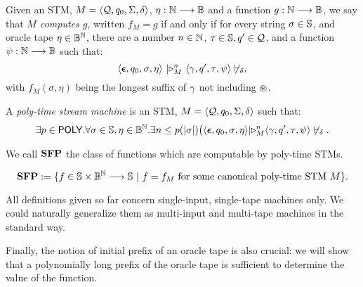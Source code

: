 \begin{defn}\label{df:STMcomputation}
Given an STM,
$M = \langle \textcolor{black}{\mathcal{Q}}, \textcolor{black}{q_0}, \textcolor{black}{\Sigma}, \textcolor{black}{\delta}\rangle$,
$\eta:\mathbb{N} \longrightarrow \mathbb{B}$ and a function
$g : \mathbb{N} \longrightarrow \mathbb{B}$,
we say that
\emph{$M$ computes $g$},
written $f_M = g$ if and only if for every
string $\sigma\in \mathbb{S}$,
and oracle tape $\textcolor{black}{\eta} \in \mathbb{B}^{\mathbb{N}}$,
there are a number $n\in \mathbb{N}$, $\textcolor{black}{\tau}\in \mathbb{S}, \textcolor{black}{q'} \in \mathcal{Q}$,
and a function
$\textcolor{black}{\psi} : \mathbb{N} \longrightarrow \mathbb{B}$ such that:
$$
\langle \textcolor{black}{\bm{\epsilon}}, \textcolor{black}{q_0}, \textcolor{black}{\sigma}, \textcolor{black}{\eta}\rangle
\ \lvert\triangleright^n_M \
\langle \textcolor{black}{\gamma}, \textcolor{black}{q'}, \textcolor{black}{\tau}, \textcolor{black}{\psi}\rangle
\not\vdash_{\delta},
$$
with $f_M(\sigma, \eta)$ being
the longest suffix of $\textcolor{black}{\gamma}$ not including
$\textcolor{black}{\circledast}$.
\end{defn}



\begin{defn}\label{df:PSTM}
A \emph{poly-time stream machine}
is an STM,
$M= \langle \textcolor{black}{\mathcal{Q}}, \textcolor{black}{q_0}, \textcolor{black}{\Sigma}, \textcolor{black}{\delta}\rangle$
such that:
$$
\exists p\in \textsf{POLY}.
\forall \textcolor{black}{\sigma} \in \mathbb{S},
\eta \in \mathbb{B}^{\mathbb{N}}.
\exists n \leq p(|\textcolor{black}{\sigma}|)
\big(\langle \textcolor{black}{\bm{\epsilon}},
\textcolor{black}{q_0}, \textcolor{black}{\sigma}, \textcolor{black}{\eta} \rangle
\lvert\triangleright^n_{M}
\langle \textcolor{black}{\gamma}, \textcolor{black}{q'}, \textcolor{black}{\tau}, \textcolor{black}{\psi}\rangle \not\vdash_{\delta}.
$$
\end{defn}
%
%
\noindent
We call $\mathbf{SFP}$ the class of functions which
are computable by poly-time STMs.


\begin{defn}\label{df:SFP}
$$
\mathbf{SFP} := \{ f \in \mathbb{S} \times \mathbb{B}^{\mathbb{N}}\longrightarrow \mathbb{S} \ | \
f = f_{M} \text{ for some canonical poly-time STM }M\}.
$$
\end{defn}
%
%
\noindent



\begin{remark}
All definitions given so far concern single-input,
single-tape machines only.
%
We could naturally generalize them as
multi-input and multi-tape machines
in the standard way.
\end{remark}





Finally, the notion of initial prefix of an
oracle tape is also crucial:
we will show that a polynomially long prefix
of the oracle tape is sufficient to determine
the value of the function.


